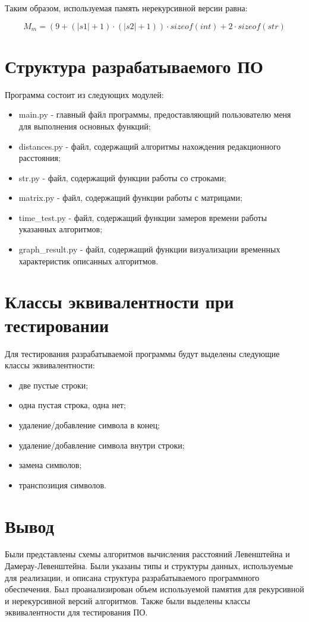 Таким образом, используемая память нерекурсивной версии равна:

\begin{equation}
	\label{eq:mm}
	M_{m} = (9+(|s1|+1) \cdot (|s2|+1)) \cdot sizeof(int)+2 \cdot sizeof(str)
\end{equation}

\section{Структура разрабатываемого ПО}

Программа состоит из следующих модулей:

\begin{itemize}
	\item main.py - главный файл программы, предоставляющий пользователю меня для выполнения основных функций;
	\item distances.py - файл, содержащий алгоритмы нахождения редакционного расстояния;
	\item str.py - файл, содержащий функции работы со строками;
	\item matrix.py - файл, содержащий функции работы с матрицами;
	\item time\_test.py - файл, содержащий функции замеров времени работы указанных алгоритмов;
	\item graph\_result.py - файл, содержащий функции визуализации временных характеристик описанных алгоритмов.
\end{itemize}

\section{Классы эквивалентности при тестировании}

Для тестирования разрабатываемой программы будут выделены следующие классы эквивалентности:

\begin{itemize}
	\item две пустые строки;
	\item одна пустая строка, одна нет;
	\item удаление/добавление символа в конец;
	\item удаление/добавление символа внутри строки;
	\item замена символов;
	\item транспозиция символов.
\end{itemize}

\section{Вывод}

Были представлены схемы алгоритмов вычисления расстояний Левенштейна и Дамерау-Левенштейна. Были указаны типы и структуры данных, используемые для реализации, и описана структура разрабатываемого программного обеспечения. Был проанализирован объем используемой памятия для рекурсивной и нерекурсивной версий алгоритмов. Также были выделены классы эквивалентности для тестирования ПО.
